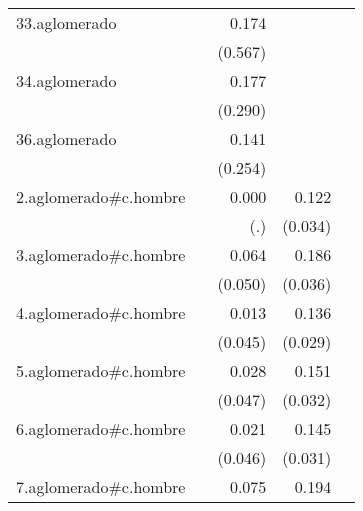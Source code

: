 {\begin{longtable}{l*{4}{D{.}{.}{-1}}}
\addlinespace
33.aglomerado&                     &       0.174         &                     &                     \\
            &                     &     (0.567)         &                     &                     \\
\addlinespace
34.aglomerado&                     &       0.177         &                     &                     \\
            &                     &     (0.290)         &                     &                     \\
\addlinespace
36.aglomerado&                     &       0.141         &                     &                     \\
            &                     &     (0.254)         &                     &                     \\
\addlinespace
2.aglomerado#c.hombre&                     &       0.000         &       0.122\sym{***}&                     \\
            &                     &         (.)         &     (0.034)         &                     \\
\addlinespace
3.aglomerado#c.hombre&                     &       0.064         &       0.186\sym{***}&                     \\
            &                     &     (0.050)         &     (0.036)         &                     \\
\addlinespace
4.aglomerado#c.hombre&                     &       0.013         &       0.136\sym{***}&                     \\
            &                     &     (0.045)         &     (0.029)         &                     \\
\addlinespace
5.aglomerado#c.hombre&                     &       0.028         &       0.151\sym{***}&                     \\
            &                     &     (0.047)         &     (0.032)         &                     \\
\addlinespace
6.aglomerado#c.hombre&                     &       0.021         &       0.145\sym{***}&                     \\
            &                     &     (0.046)         &     (0.031)         &                     \\
\addlinespace
7.aglomerado#c.hombre&                     &       0.075         &       0.194\sym{***}&                     \\

\end{longtable}}
